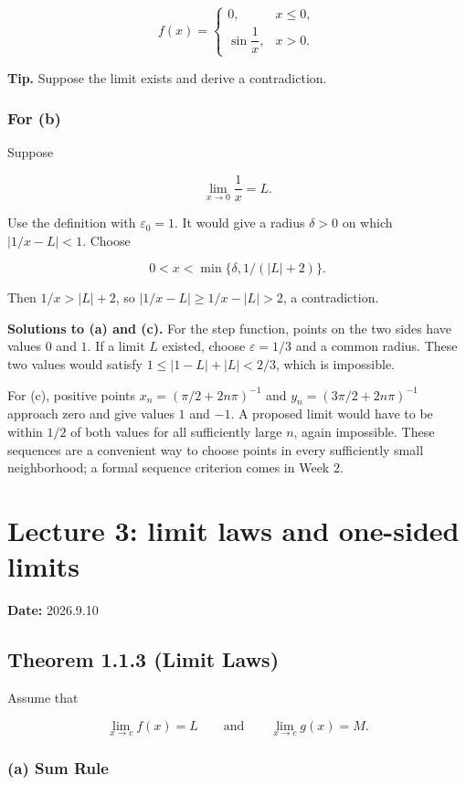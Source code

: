 \documentclass[11pt,a4paper]{article}
\begin{document}
\[
f(x)=
\begin{cases}
0, & x\leq0,\\
\sin\dfrac{1}{x}, & x>0.
\end{cases}
\]

\textbf{Tip.} Suppose the limit exists and derive a contradiction.

\subsubsection{For (b)}\label{for-b}

Suppose

\[
\lim_{x\to0}\frac{1}{x}=L.
\]

Use the definition with \(\varepsilon_0=1\). It would give a radius
\(\delta>0\) on which \(|1/x-L|<1\). Choose

\[
0<x<\min\{\delta,1/(|L|+2)\}.
\]

Then \(1/x>|L|+2\), so \(|1/x-L|\ge 1/x-|L|>2\), a contradiction.

\textbf{Solutions to (a) and (c).} For the step function, points on the
two sides have values \(0\) and \(1\). If a limit \(L\) existed, choose
\(\varepsilon=1/3\) and a common radius. These two values would satisfy
\(1\le |1-L|+|L|<2/3\), which is impossible.

For (c), positive points \(x_n=(\pi/2+2n\pi)^{-1}\) and
\(y_n=(3\pi/2+2n\pi)^{-1}\) approach zero and give values \(1\) and
\(-1\). A proposed limit would have to be within \(1/2\) of both values
for all sufficiently large \(n\), again impossible. These sequences are
a convenient way to choose points in every sufficiently small
neighborhood; a formal sequence criterion comes in Week 2.

\section{Lecture 3: limit laws and one-sided
limits}\label{lecture-3-limit-laws-and-one-sided-limits}

\textbf{Date:} 2026.9.10

\subsection{Theorem 1.1.3 (Limit Laws)}\label{theorem-1.1.3-limit-laws}

Assume that

\[
\lim_{x\to c}f(x)=L
\qquad\text{and}\qquad
\lim_{x\to c}g(x)=M.
\]

\subsubsection{(a) Sum Rule}\label{a-sum-rule}
\end{document}

